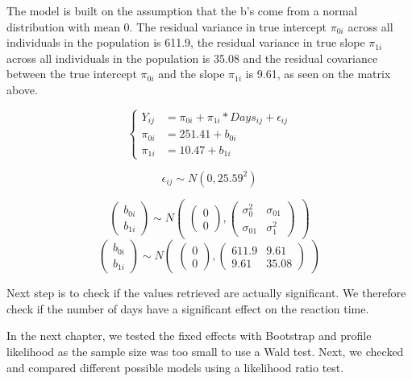 \documentclass[
]{article}
\begin{document}
The model is built on the assumption that the b's come from a normal
distribution with mean 0. The residual variance in true intercept
\(\pi_{0i}\) across all individuals in the population is 611.9, the
residual variance in true slope \(\pi_{1i}\) across all individuals in
the population is 35.08 and the residual covariance between the true
intercept \(\pi_{0i}\) and the slope \(\pi_{1i}\) is 9.61, as seen on
the matrix above.

\[
\begin{cases}
Y_{ij}   &= \pi_{0i} + \pi_{1i}* Days_{ij} + \epsilon_{ij} \\
\pi_{0i} &= 251.41 + b_{0i} \\
\pi_{1i} &= 10.47 + b_{1i}
\end{cases}
\]

\[\epsilon_{ij} \sim N(0,25.59^2)\]

\[
\begin{pmatrix} b_{0i} \\ b_{1i} \end{pmatrix}
\sim N
\begin{pmatrix}
\begin{pmatrix} 0 \\ 0 \end{pmatrix},
\begin{pmatrix}
\sigma_{0}^2 & \sigma_{01} \\
\sigma_{01} & \sigma_{1}^2 
\end{pmatrix}
\end{pmatrix}
\] \[
\begin{pmatrix} b_{0i} \\ b_{1i} \end{pmatrix}
\sim N
\begin{pmatrix}
\begin{pmatrix} 0 \\ 0 \end{pmatrix},
\begin{pmatrix}
611.9 & 9.61 \\
9.61 & 35.08 
\end{pmatrix}
\end{pmatrix}
\]

Next step is to check if the values retrieved are actually significant.
We therefore check if the number of days have a significant effect on
the reaction time.

In the next chapter, we tested the fixed effects with Bootstrap and
profile likelihood as the sample size was too small to use a Wald test.
Next, we checked and compared different possible models using a
likelihood ratio test.
\end{document}
